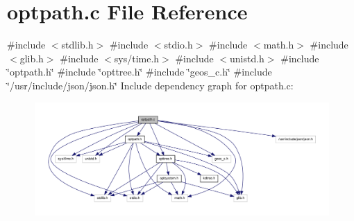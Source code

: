 \hypertarget{a00015}{\section{optpath.\-c \-File \-Reference}
\label{dd/d1b/a00015}
}
{\ttfamily \#include $<$stdlib.\-h$>$}\*
{\ttfamily \#include $<$stdio.\-h$>$}\*
{\ttfamily \#include $<$math.\-h$>$}\*
{\ttfamily \#include $<$glib.\-h$>$}\*
{\ttfamily \#include $<$sys/time.\-h$>$}\*
{\ttfamily \#include $<$unistd.\-h$>$}\*
{\ttfamily \#include \char`\"{}optpath.\-h\char`\"{}}\*
{\ttfamily \#include \char`\"{}opttree.\-h\char`\"{}}\*
{\ttfamily \#include \char`\"{}geos\-\_\-c.\-h\char`\"{}}\*
{\ttfamily \#include \char`\"{}/usr/include/json/json.\-h\char`\"{}}\*
\-Include dependency graph for optpath.\-c\-:\nopagebreak
\begin{figure}[H]
\begin{center}
\leavevmode
\includegraphics[width=350pt]{d3/dfe/a00025}
\end{center}
\end{figure}
